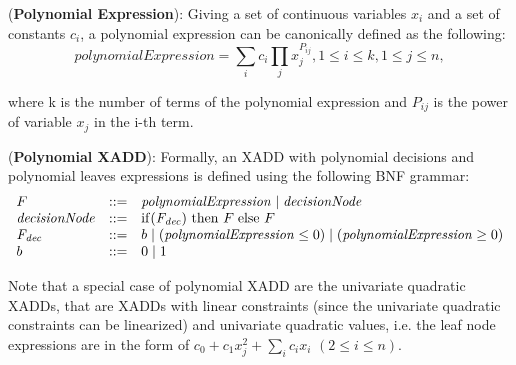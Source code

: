 \documentclass[twoside,11pt]{article}
\newenvironment{mydef}[1][Definition]{\begin{trivlist}
\item[\hskip \labelsep {\bfseries #1}]}{\end{trivlist}}
\begin{document}
\begin{mydef}(\textbf{Polynomial Expression}):
Giving a set of continuous variables $x_i$ and a set of constants $c_i$, a polynomial  expression can be canonically defined  as the following:
\begin{equation}
\mathit{polynomialExpression} = \sum_{i} c_i \prod_{j} x_j^{P_{ij}}, 1 \leq i \leq k, 1 \leq j \leq n, 
\label{Eq:canonicalpoly}
\end{equation}
\end{mydef}

where k is the number of terms of the polynomial expression and $P_{ij}$ is the power of variable $x_j$ in the i-th term. 

\begin{mydef}(\textbf{Polynomial XADD}):
Formally, an XADD with polynomial decisions and polynomial leaves expressions is defined using the following BNF grammar: 
\begin{equation}
\nonumber
\begin{array}{lll}
F&::=&  \mathit{polynomialExpression}  \hspace{1mm} \vert \hspace{1mm}   \mathit{decisionNode}\\
\mathit{decisionNode} &::=& \mathrm{if} (\mathit{F_{dec}})\ \mathrm{then}\ F \hspace{1mm} \mathrm{else}\ F \\ 
\mathit{F_{dec}} &::=& b \hspace{1mm}  \vert \hspace{1mm}  ( \mathit{polynomialExpression} \leq 0)  \hspace{1mm}\vert \hspace{1mm}
 ( \mathit{polynomialExpression} \geq 0)   
\\
b&::=& 0\hspace{1mm} |\hspace{1mm} 1
\end{array}
\end{equation}
\end{mydef}

Note that a special case of polynomial XADD are the univariate quadratic XADDs, that are XADDs with linear constraints (since the univariate quadratic constraints can be linearized) and univariate quadratic values, i.e. the leaf node expressions are in the form of $c_0+ c_1 x_j^2 + \sum_{i} c_i x_i$  $(2 \leq i \leq n)$. 
\end{document}
